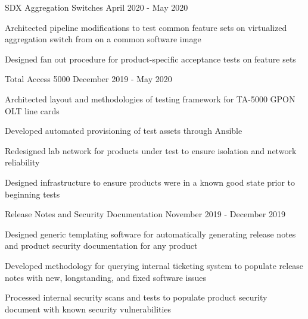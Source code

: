 
\begin{cventries}
  \cventry
    {} {SDX Aggregation Switches} {} {April 2020 - May 2020} {
      \begin{cvitems}
        \item {Architected pipeline modifications to test common feature sets on virtualized aggregation switch from on a common software image}
        \item {Designed fan out procedure for product-specific acceptance tests on feature sets}
      \end{cvitems}
    }
  \cventry
    {} {Total Access 5000} {} {December 2019 - May 2020} {
      \begin{cvitems}
        \item {Architected layout and methodologies of testing framework for TA-5000 GPON OLT line cards}
        \item {Developed automated provisioning of test assets through Ansible}
        \item {Redesigned lab network for products under test to ensure isolation and network reliability}
        \item {Designed infrastructure to ensure products were in a known good state prior to beginning tests}
      \end{cvitems}
    }

  \cventry
    {} {Release Notes and Security Documentation} {} {November 2019 - December 2019} {
      \begin{cvitems}
        \item {Designed generic templating software for automatically generating release notes and product security documentation for any product}
        \item {Developed methodology for querying internal ticketing system to populate release notes with new, longstanding, and fixed software issues}
        \item {Processed internal security scans and tests to populate product security document with known security vulnerabilities}
      \end{cvitems}
    }


\end{cventries}
